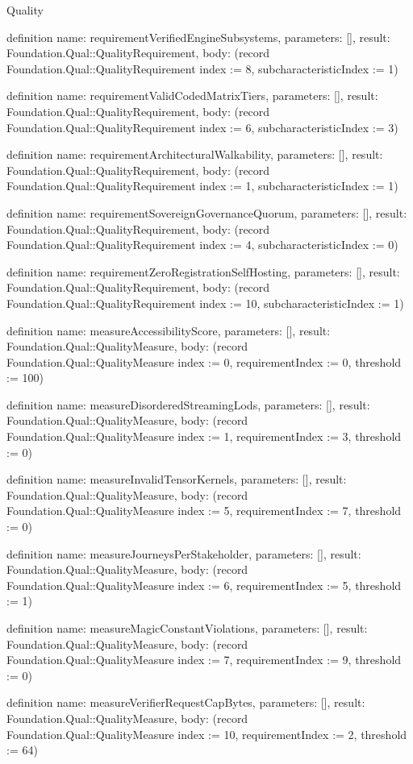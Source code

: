 \begin{lexlean}{Quality}
\begin{semanticmodule}
definition{
  name: requirementVerifiedEngineSubsystems,
  parameters: [],
  result: Foundation.Qual::QualityRequirement,
  body: (record Foundation.Qual::QualityRequirement {index := 8, subcharacteristicIndex := 1})
}

definition{
  name: requirementValidCodedMatrixTiers,
  parameters: [],
  result: Foundation.Qual::QualityRequirement,
  body: (record Foundation.Qual::QualityRequirement {index := 6, subcharacteristicIndex := 3})
}

definition{
  name: requirementArchitecturalWalkability,
  parameters: [],
  result: Foundation.Qual::QualityRequirement,
  body: (record Foundation.Qual::QualityRequirement {index := 1, subcharacteristicIndex := 1})
}

definition{
  name: requirementSovereignGovernanceQuorum,
  parameters: [],
  result: Foundation.Qual::QualityRequirement,
  body: (record Foundation.Qual::QualityRequirement {index := 4, subcharacteristicIndex := 0})
}

definition{
  name: requirementZeroRegistrationSelfHosting,
  parameters: [],
  result: Foundation.Qual::QualityRequirement,
  body: (record Foundation.Qual::QualityRequirement {index := 10, subcharacteristicIndex := 1})
}

definition{
  name: measureAccessibilityScore,
  parameters: [],
  result: Foundation.Qual::QualityMeasure,
  body: (record Foundation.Qual::QualityMeasure {index := 0, requirementIndex := 0, threshold := 100})
}

definition{
  name: measureDisorderedStreamingLods,
  parameters: [],
  result: Foundation.Qual::QualityMeasure,
  body: (record Foundation.Qual::QualityMeasure {index := 1, requirementIndex := 3, threshold := 0})
}

definition{
  name: measureInvalidTensorKernels,
  parameters: [],
  result: Foundation.Qual::QualityMeasure,
  body: (record Foundation.Qual::QualityMeasure {index := 5, requirementIndex := 7, threshold := 0})
}

definition{
  name: measureJourneysPerStakeholder,
  parameters: [],
  result: Foundation.Qual::QualityMeasure,
  body: (record Foundation.Qual::QualityMeasure {index := 6, requirementIndex := 5, threshold := 1})
}

definition{
  name: measureMagicConstantViolations,
  parameters: [],
  result: Foundation.Qual::QualityMeasure,
  body: (record Foundation.Qual::QualityMeasure {index := 7, requirementIndex := 9, threshold := 0})
}

definition{
  name: measureVerifierRequestCapBytes,
  parameters: [],
  result: Foundation.Qual::QualityMeasure,
  body: (record Foundation.Qual::QualityMeasure {index := 10, requirementIndex := 2, threshold := 64})
}


\end{semanticmodule}
\end{lexlean}
